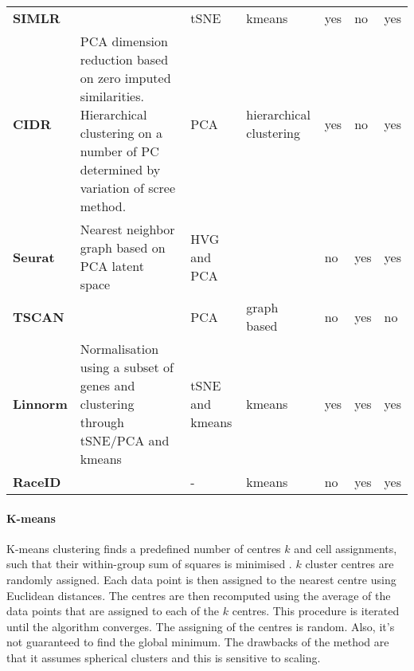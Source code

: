 \documentclass[12pt, a4paper]{article}\usepackage[]{graphicx}\usepackage[]{color}
\begin{document}
\begin{table}[htbp]
{\begin{tabular}{p{5.9em}lp{8em}p{5.5em}p{3em}p{3em}p{3em}}
    \textbf{SIMLR} &       & tSNE  & kmeans & yes   & no    & yes \\
    \textbf{CIDR} & \multicolumn{1}{p{13.085em}}{PCA dimension reduction based on zero imputed similarities.  Hierarchical clustering on a number of PC determined by variation of scree method.} & PCA   & hierarchical clustering & yes   & no    & yes \\
    \textbf{Seurat} & \multicolumn{1}{p{13.085em}}{Nearest neighbor graph based on PCA latent space} & HVG and PCA & \multicolumn{1}{l}{} & no    & yes   & yes \\
    \midrule
    \textbf{TSCAN} &       & PCA   & graph based & no    & yes   & no \\
    \midrule
    \textbf{Linnorm} & \multicolumn{1}{p{13.085em}}{Normalisation using a subset of genes and clustering through tSNE/PCA and kmeans} & tSNE and kmeans & kmeans & yes   & yes   & yes \\
    \midrule
    \textbf{RaceID} &       & -     & kmeans & no    & yes   & yes \\
    \bottomrule
    \end{tabular}}%
  \label{tab:addlabel}%
\end{table}%


\paragraph{K-means}
K-means clustering finds a predefined number of centres $k$ and cell assignments, such that their within-group sum of squares is minimised \citep{hartigan1979algorithm}. $k$ cluster centres are randomly assigned.
Each data point is then assigned to the nearest centre using Euclidean distances. The centres are then recomputed using the average of the data points that are assigned to each of the $k$ centres. This procedure is iterated until the algorithm converges. The assigning of the centres is random. Also, it's not guaranteed to find the global minimum.  The drawbacks of the method are that it assumes spherical clusters and this is sensitive to scaling. 
\end{document}
